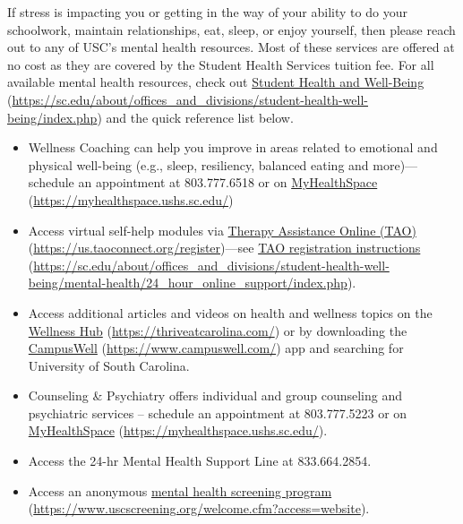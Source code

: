 \documentclass[11pt,letterpaper]{article}
\begin{document}
If stress is impacting you or getting in the way of your ability to do your schoolwork, maintain relationships, eat, sleep, or enjoy yourself, then please reach out to any of USC's mental health resources. Most of these services are offered at no cost as they are covered by the Student Health Services tuition fee. For all available mental health resources, check out \href{https://sc.edu/about/offices\_and\_divisions/student-health-well-being/index.php}{Student Health and Well-Being} (\url{https://sc.edu/about/offices\_and\_divisions/student-health-well-being/index.php}) and the quick reference list below. 
	\begin{itemize}
	\item Wellness Coaching can help you improve in areas related to emotional and physical well-being (e.g., sleep, resiliency, balanced eating and more)---schedule an appointment at 803.777.6518 or on \href{https://myhealthspace.ushs.sc.edu/}{MyHealthSpace} (\url{https://myhealthspace.ushs.sc.edu/})
	
	\item Access virtual self-help modules via \href{https://us.taoconnect.org/register}{Therapy Assistance Online (TAO)} (\url{https://us.taoconnect.org/register})---see \href{https://sc.edu/about/offices\_and\_divisions/student-health-well-being/mental-health/24\_hour\_online\_support/index.php}{TAO registration instructions} (\url{https://sc.edu/about/offices\_and\_divisions/student-health-well-being/mental-health/24\_hour\_online\_support/index.php}).
	
	\item Access additional articles and videos on health and wellness topics on the \href{https://thriveatcarolina.com/}{Wellness Hub} (\url{https://thriveatcarolina.com/}) or by downloading the \href{https://www.campuswell.com/}{CampusWell} (\url{https://www.campuswell.com/}) app and searching for University of South Carolina.
	
	\item Counseling \& Psychiatry offers individual and group counseling and psychiatric services – schedule an appointment at 803.777.5223 or on \href{https://myhealthspace.ushs.sc.edu/}{MyHealthSpace} (\url{https://myhealthspace.ushs.sc.edu/}).
	
	\item Access the 24-hr Mental Health Support Line at 833.664.2854.
	
	\item Access an anonymous \href{https://www.uscscreening.org/welcome.cfm?access=website}{mental health screening program} (\url{https://www.uscscreening.org/welcome.cfm?access=website}).
	\end{itemize} \sectionbreak
\end{document}
